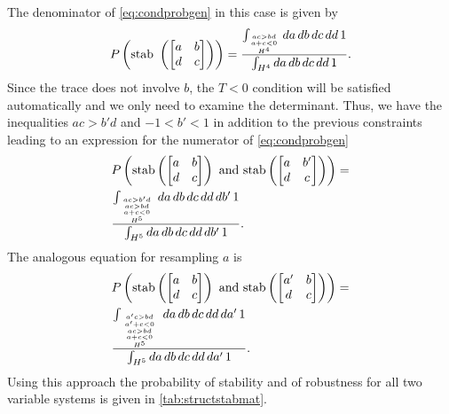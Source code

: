 The denominator of \ref{eq:condprobgen} in this case is given by
\begin{align*}
P\left(\textrm{stab } \left( \begin{bmatrix}
a & b \\
d & c
\end{bmatrix} \right) \right) = \frac{\int_{\genfrac{}{}{0pt}{}{\genfrac{}{}{0pt}{}{ac>bd}{a+c<0}}{H^4}} da\,db\,dc\,dd\,1}{\int_{H^4} da\,db\,dc\,dd\,1}.
\end{align*}
Since the trace does not involve $b$, the $T<0$ condition will be satisfied automatically and we only need to examine the determinant. Thus, we have the inequalities $ac > b'd$ and $-1 < b' < 1$ in addition to the previous constraints leading to an expression for the numerator of \ref{eq:condprobgen}
\begin{align*}
& P\left(\textrm{stab} \left( \begin{bmatrix}
a & b \\
d & c
\end{bmatrix} \right) \textrm{ and stab} \left( \begin{bmatrix}
a & b' \\
d & c
\end{bmatrix} \right) \right) = \\
& \frac{\int_{{{ac>b'd \atop ac>bd} \atop a+c<0} \atop H^5} da\,db\,dc\,dd\,db'\,1}{\int_{H^5} da\,db\,dc\,dd\,db'\,1}.
\end{align*}
The analogous equation for resampling $a$ is
\begin{align*}
& P\left(\textrm{stab} \left( \begin{bmatrix}
a & b \\
d & c
\end{bmatrix} \right) \textrm{ and stab}
\left( \begin{bmatrix}
a' & b \\
d & c
\end{bmatrix} \right) \right) = \\
& \frac{\int_{{{{a'c>bd \atop a' + c < 0} \atop ac>bd} \atop a+c<0} \atop H^5} da\,db\,dc\,dd\,da'\,1}{\int_{H^5} da\,db\,dc\,dd\,da'\,1}.
\end{align*}
Using this approach the probability of stability and of robustness for all two variable systems is given in \ref{tab:structstabmat}.

